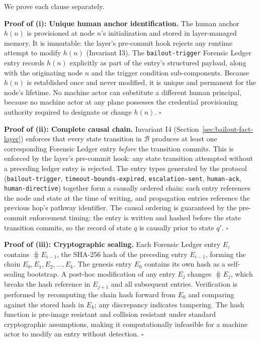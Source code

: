 \begin{Proof}
We prove each clause separately.

\medskip
\noindent\textbf{Proof of (i): Unique human anchor identification.}
The human anchor $h(n)$ is provisioned at node $n$'s initialization and stored
in \fact{} layer-managed memory.  It is immutable: the \fact{} layer's
pre-commit hook rejects any runtime attempt to modify $h(n)$ (Invariant I3).
The \texttt{bailout-trigger} Forensic Ledger entry records $h(n)$ explicitly
as part of the entry's structured payload, along with the originating node
$n$ and the trigger condition sub-components.  Because $h(n)$ is established
once and never modified, it is unique and permanent for the node's lifetime.
No machine actor can substitute a different human principal, because no
machine actor at any plane possesses the credential provisioning authority
required to designate or change $h(n)$.  $\square$

\medskip
\noindent\textbf{Proof of (ii): Complete causal chain.}
Invariant I4 (Section~\ref{sec:bailout-fact-layer}) enforces that every state
transition in $\mathcal{B}$ produces at least one corresponding Forensic
Ledger entry \emph{before} the transition commits.  This is enforced by the
\fact{} layer's pre-commit hook: any state transition attempted without a
preceding ledger entry is rejected.  The entry types generated by the protocol
(\texttt{bailout-trigger}, \texttt{timeout-bounds-expired},
\texttt{escalation-sent}, \texttt{human-ack}, \texttt{human-directive})
together form a causally ordered chain: each entry references the node and
state at the time of writing, and propagation entries reference the previous
hop's pathway identifier.  The causal ordering is guaranteed by the
pre-commit enforcement timing: the entry is written and hashed before the
state transition commits, so the record of state $q$ is causally prior to
state $q'$.  $\square$

\medskip
\noindent\textbf{Proof of (iii): Cryptographic sealing.}
Each Forensic Ledger entry $E_i$ contains $\hash{E_{i-1}}$, the SHA-256 hash
of the preceding entry $E_{i-1}$, forming the chain
$E_0, E_1, E_2, \ldots, E_k$.  The genesis entry $E_0$ contains its own hash
as a self-sealing bootstrap.  A post-hoc modification of any entry $E_j$
changes $\hash{E_j}$, which breaks the hash reference in $E_{j+1}$ and all
subsequent entries.  Verification is performed by recomputing the chain hash
forward from $E_0$ and comparing against the stored hash in $E_k$; any
discrepancy indicates tampering.  The hash function is pre-image resistant
and collision resistant under standard cryptographic assumptions, making it
computationally infeasible for a machine actor to modify an entry without
detection.  $\square$
\end{Proof}


